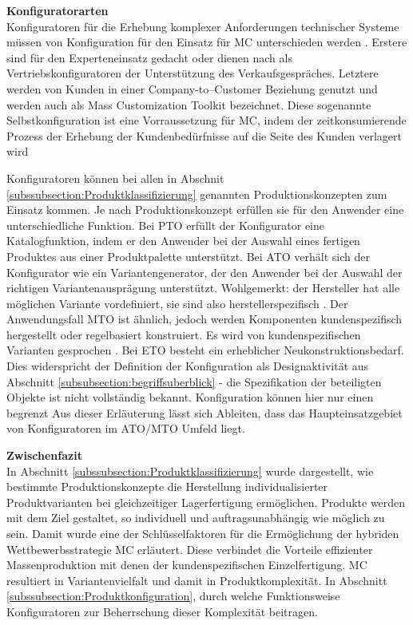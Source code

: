 \documentclass[12pt,a4paper,bibliography=totocnumbered,listof=totoc]{scrartcl}
\begin{document}
\textbf{Konfiguratorarten}\\
Konfiguratoren für die Erhebung komplexer Anforderungen technischer Systeme  müssen von Konfiguration für den Einsatz für \ac{MC} unterschieden werden \citep{felferning14}. Erstere sind für den Experteneinsatz gedacht oder dienen nach \citet{piller06} als Vertriebskonfiguratoren der Unterstützung des Verkaufsgespräches.   Letztere werden von Kunden in einer Company-to–Customer Beziehung genutzt und werden auch als Mass Customization Toolkit bezeichnet. Diese sogenannte Selbstkonfiguration ist eine Vorraussetzung für \ac{MC}, indem der zeitkonsumierende Prozess der Erhebung der Kundenbedürfnisse auf die Seite des Kunden verlagert wird \citep{piller06}

Konfiguratoren können bei allen in Abschnit \ref{subssubsection:Produktklassifizierung} genannten Produktionskonzepten zum Einsatz kommen. Je nach Produktionskonzept erfüllen sie für den Anwender eine unterschiedliche Funktion. Bei \ac{PTO} erfüllt der Konfigurator eine Katalogfunktion, indem er den Anwender bei der Auswahl eines fertigen Produktes aus einer Produktpalette unterstützt. Bei \ac{ATO} verhält sich der Konfigurator wie ein Variantengenerator, der den Anwender bei der Auswahl der richtigen Variantenausprägung unterstützt. Wohlgemerkt: der Hersteller hat alle möglichen Variante vordefiniert, sie sind also herstellerspezifisch \citep{schomburg80}. Der Anwendungsfall \ac{MTO} ist ähnlich, jedoch werden Komponenten kundenspezifisch hergestellt oder regelbasiert konstruiert. Es wird von kundenspezifischen Varianten gesprochen \citep{schomburg80}. Bei \ac{ETO} besteht ein erheblicher Neukonstruktionsbedarf. Dies widerspricht der Definition der Konfiguration als Designaktivität aus Abschnitt \ref{subsubsection:begriffsuberblick}
 - die Spezifikation der beteiligten Objekte ist nicht vollständig bekannt. Konfiguration können hier nur einen begrenzt Aus dieser Erläuterung lässt sich Ableiten, dass das Haupteinsatzgebiet von Konfiguratoren im \ac{ATO}/\ac{MTO} Umfeld liegt.

\textbf{Zwischenfazit}\\
In Abschnitt \ref{subssubsection:Produktklassifizierung} wurde dargestellt, wie bestimmte Produktionskonzepte die Herstellung individualisierter Produktvarianten bei gleichzeitiger Lagerfertigung ermöglichen. Produkte werden mit dem Ziel gestaltet, so individuell und auftragsunabhängig wie möglich zu sein. Damit wurde eine der Schlüsselfaktoren für die Ermöglichung der hybriden Wettbewerbsstrategie \ac{MC} erläutert. Diese verbindet die Vorteile effizienter Massenproduktion mit denen
der kundenspezifischen Einzelfertigung\citep{piller98}. \ac{MC} resultiert in Variantenvielfalt und damit in Produktkomplexität. In Abschnitt \ref{subssubsection:Produktkonfiguration}, durch welche Funktionsweise Konfiguratoren zur Beherrschung dieser Komplexität beitragen.
\end{document}

